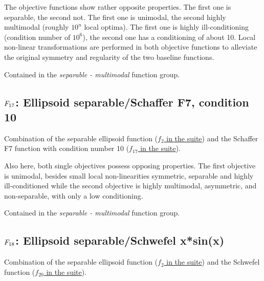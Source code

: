 The objective functions show rather opposite properties.
The first one is separable, the second not. The first one
is unimodal, the second highly multimodal (roughly \(10^n\) local
optima). The first one is highly ill-conditioning (condition number of
\(10^6\)), the second one has a conditioning of about 10. Local
non-linear transformations are performed in both objective functions
to alleviate the original symmetry and regularity of the two
baseline functions.

Contained in the \emph{separable - multimodal} function group.



\subsection[\texorpdfstring{\protect\(F_{17}\protect\): Ellipsoid separable/Schaffer F7, condition 10}{F17: Ellipsoid separable/Schaffer F7, condition 10}]{\texorpdfstring{\protect\(F_{17}\protect\): Ellipsoid separable/Schaffer F7, condition 10}{}}
\label{index:ellipsoid-separable-schaffer-f7-condition-10}\label{index:f17}
Combination of the separable ellipsoid function (\href{https://coco.gforge.inria.fr/downloads/download16.00/bbobdocfunctions.pdf\#page=10}{\(f_2\) in the \bbob suite}) and the Schaffer F7 function with condition number 10
(\href{https://coco.gforge.inria.fr/downloads/download16.00/bbobdocfunctions.pdf\#page=85}{\(f_{17}\) in the \bbob suite}).

Also here, both single objectives possess opposing properties.
The first objective is unimodal, besides small local non-linearities symmetric,
separable and highly ill-conditioned while the second objective is highly
multimodal, asymmetric, and non-separable, with only a low conditioning.

Contained in the \emph{separable - multimodal} function group.



\subsection[\texorpdfstring{\protect\(F_{18}\protect\): Ellipsoid separable/Schwefel x*sin(x)}{F18: Ellipsoid separable/Schwefel x*sin(x)}]{\texorpdfstring{\protect\(F_{18}\protect\): Ellipsoid separable/Schwefel x*sin(x)}{}}
\label{index:ellipsoid-separable-schwefel-x-sin-x}\label{index:f18}
Combination of the separable ellipsoid function (\href{https://coco.gforge.inria.fr/downloads/download16.00/bbobdocfunctions.pdf\#page=10}{\(f_2\) in the \bbob suite}) and the Schwefel function (\href{https://coco.gforge.inria.fr/downloads/download16.00/bbobdocfunctions.pdf\#page=100}{\(f_{20}\) in the \bbob suite}).

